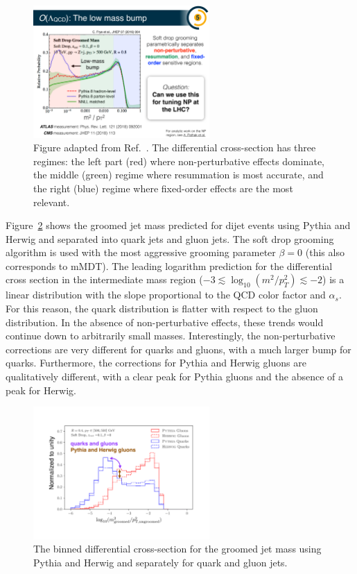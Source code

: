 \documentclass[11pt]{cernrep}
\begin{document}
\begin{figure}[h!]
\centering
\includegraphics[width=0.6\textwidth]{figs/Lowmassbump.pdf}
\caption{Figure adapted from Ref.~\cite{Frye:2016aiz}.  The differential cross-section has three regimes: the left part (red) where non-perturbative effects dominate, the middle (green) regime where resummation is most accurate, and the right (blue) regime where fixed-order effects are the most relevant.}
\label{fig:jets:np:illustration}
\end{figure}

Figure~\ref{fig:jets:np:qg} shows the groomed jet mass predicted for dijet events using Pythia and Herwig and separated into quark jets and gluon jets.  The soft drop grooming algorithm is used with the most aggressive grooming parameter $\beta=0$ (this also corresponds to mMDT).  The leading logarithm prediction for the differential cross section in the intermediate mass region ($-3\lesssim\log_{10}(m^2/p_T^2)\lesssim -2$) is a linear distribution with the slope proportional to the QCD color factor and $\alpha_s$.  For this reason, the quark distribution is flatter with respect to the gluon distribution.  In the absence of non-perturbative effects, these trends would continue down to arbitrarily small masses. Interestingly, the non-perturbative corrections are very different for quarks and gluons, with a much larger bump for quarks.  Furthermore, the corrections for Pythia and Herwig gluons are qualitatively different, with a clear peak for Pythia gluons and the absence of a peak for Herwig.

\begin{figure}[h!]
\centering
\includegraphics[width=0.6\textwidth]{figs/NPbumpvariations.pdf}
\caption{The binned differential cross-section for the groomed jet mass using Pythia and Herwig and separately for quark and gluon jets.}
\label{fig:jets:np:qg}
\end{figure}
\end{document}
